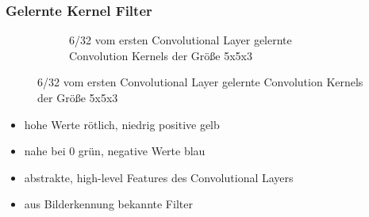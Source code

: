 \documentclass{beamer}
\begin{document}
\begin{frame}
	\frametitle{Gelernte Kernel Filter}
	\begin{figure}
\begin{figure}
	\caption{6/32 vom ersten Convolutional Layer gelernte Convolution Kernels der Größe 5x5x3}
	\label{fig:kernel}
\end{figure}
	\end{figure}
	\begin{itemize}
		\item hohe Werte rötlich, niedrig positive gelb
		\item nahe bei 0 grün, negative Werte blau 
		\item abstrakte, high-level Features des Convolutional Layers
		\item aus Bilderkennung bekannte Filter
	\end{itemize}
\end{frame}
\end{document}
